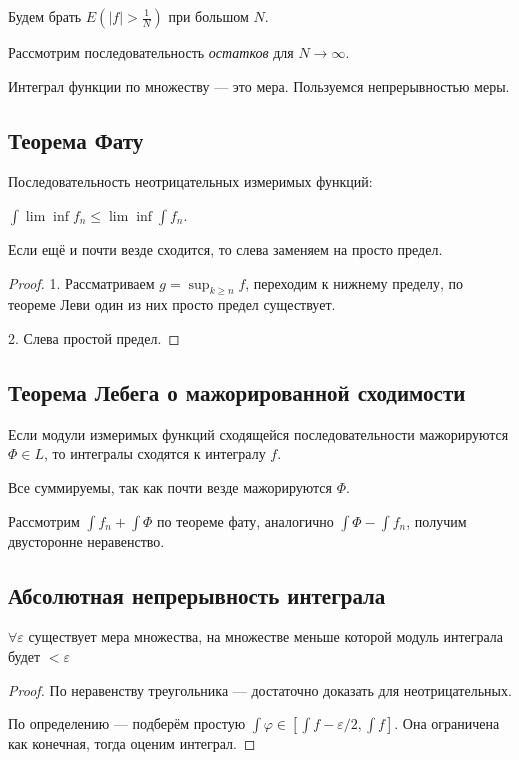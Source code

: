 \documentclass[12pt, a4paper, oneside]{memoir}
\begin{document}
Будем брать $E(|f| > \frac{1}{N})$ при большом $N$.

Рассмотрим последовательность \textit{остатков} для $N → \infty$.

Интеграл функции по множеству — это мера. Пользуемся непрерывностью меры.


\subsection{Теорема Фату}

Последовательность неотрицательных измеримых функций:

$\int \lim \inf f_n \leqslant \lim \inf \int f_n$.

Если ещё и почти везде сходится, то слева заменяем на просто предел.

\begin{proof}
    1. Рассматриваем $g = \sup_{k \geqslant n} f$, переходим к нижнему пределу, по теореме Леви один из них просто предел существует.

    2. Слева простой предел.
\end{proof}


\subsection{Теорема Лебега о мажорированной сходимости}

Если модули измеримых функций сходящейся последовательности мажорируются $\Phi \in L$, то интегралы сходятся к интегралу $f$.

Все суммируемы, так как почти везде мажорируются $\Phi$.

Рассмотрим $\int f_n + \int \Phi$ по теореме фату, аналогично $\int \Phi - \int f_n$, получим двусторонне неравенство.


\subsection{Абсолютная непрерывность интеграла}

$\forall \varepsilon$ существует мера множества, на множестве меньше которой модуль интеграла будет $< \varepsilon$

\begin{proof}
    По неравенству треугольника — достаточно доказать для неотрицательных.

    По определению — подберём простую $\int \varphi \in [\int f - \varepsilon/2, \int f]$. Она ограничена как конечная, тогда оценим интеграл.
\end{proof}
\end{document}
